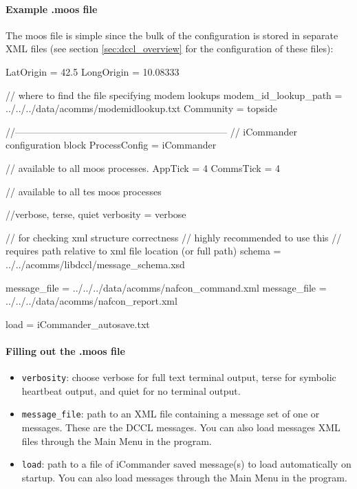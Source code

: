 \documentclass[11pt, letterpaper, oneside]{memoir}
\begin{document}
\paragraph{Example .moos file}
The moos file is simple since the bulk of the configuration is stored in separate XML files (see section \ref{sec:dccl_overview} for the configuration of these files):

\begin{small}\begin{boxedverbatim}
LatOrigin = 42.5
LongOrigin = 10.08333

// where to find the file specifying modem lookups
modem_id_lookup_path = ../../../data/acomms/modemidlookup.txt
Community = topside

//------------------------------------------------------------------
// iCommander configuration  block 
ProcessConfig = iCommander
{
  // available to all moos processes.
  AppTick    = 4
  CommsTick  = 4
  
  // available to all tes moos processes

  //verbose, terse, quiet
  verbosity = verbose

  // for checking xml structure correctness
  // highly recommended to use this
  // requires path relative to xml file location (or full path)
  schema = ../../acomms/libdccl/message_schema.xsd

  message_file = ../../../data/acomms/nafcon_command.xml
  message_file = ../../../data/acomms/nafcon_report.xml

  load = iCommander_autosave.txt  
}
\end{boxedverbatim}
\resetbvlinenumber
\end{small}

\paragraph{Filling out the .moos file}
\begin{itemize}
\item \verb|verbosity|: choose verbose for full text terminal output, terse for symbolic heartbeat output, and quiet for no terminal output.
\item \verb|message_file|: path to an XML file containing a message set of one or messages. These are the DCCL messages. You can also load messages XML files through the Main Menu in the program.
\item \verb|load|: path to a file of iCommander saved message(s) to load automatically on startup. You can also load messages through the Main Menu in the program.
\end{itemize}
\end{document}
